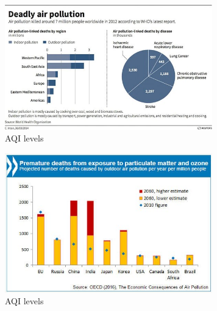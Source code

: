 \begin{figure}[h]
\centering
  \includegraphics[width=90mm]{site_survey1.jpg}
  \caption{AQI levels \cite{12}}
  \label{fig:AQI levels}
\end{figure}

\begin{figure}[h]
\centering
  \includegraphics[width=90mm]{site_survey2.jpg}
  \caption{AQI levels \cite{13}}
  \label{fig:AQI levels}
\end{figure}

